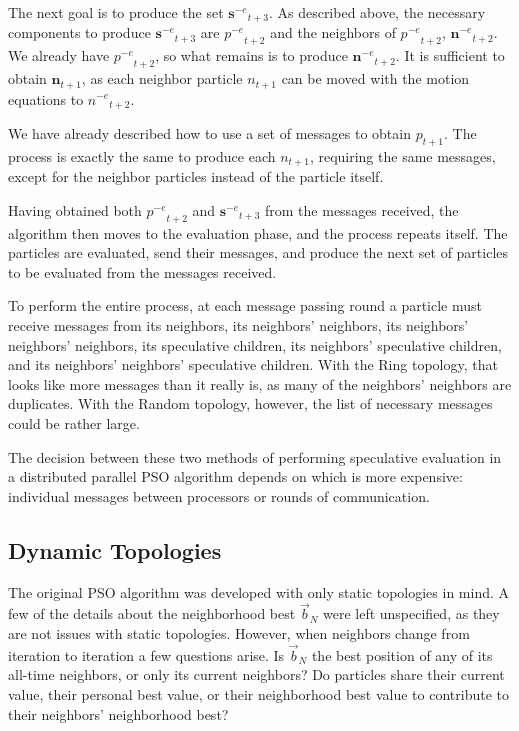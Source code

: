 \documentclass[conference,letterpaper]{IEEEtran}
\providecommand{\nbest}{\ensuremath{\Vec{b}_N}}
\providecommand{\noeval}[1]{\ensuremath{#1^{-e}}}
\providecommand{\p}{\ensuremath{p}}
\providecommand{\sset}{\ensuremath{\mathbf{s}}}
\providecommand{\n}{\ensuremath{n}}
\providecommand{\nset}{\ensuremath{\mathbf{n}}}
\begin{document}
The next goal is to produce the set $\noeval{\sset}_{t+3}$.  As described
above, the necessary components to produce $\noeval{\sset}_{t+3}$ are
$\noeval{\p}_{t+2}$ and the neighbors of $\noeval{\p}_{t+2}$,
$\noeval{\nset}_{t+2}$.  We already have $\noeval{\p}_{t+2}$, so what remains
is to produce $\noeval{\nset}_{t+2}$.  It is sufficient to obtain
$\nset_{t+1}$, as each neighbor particle $\n_{t+1}$ can be moved with the
motion equations to $\noeval{\n}_{t+2}$.

We have already described how to use a set of messages to obtain $\p_{t+1}$.
The process is exactly the same to produce each $\n_{t+1}$, requiring the same
messages, except for the neighbor particles instead of the particle itself.

Having obtained both $\noeval{\p}_{t+2}$ and $\noeval{\sset}_{t+3}$ from the
messages received, the algorithm then moves to the evaluation phase, and the
process repeats itself.  The particles are evaluated, send their messages, and
produce the next set of particles to be evaluated from the messages received.

To perform the entire process, at each message passing round a particle must
receive messages from its neighbors, its neighbors' neighbors, its neighbors'
neighbors' neighbors, its speculative children, its neighbors' speculative
children, and its neighbors' neighbors' speculative children.  With the Ring
topology, that looks like more messages than it really is, as many of the
neighbors' neighbors are duplicates.  With the Random topology, however, the
list of necessary messages could be rather large.  

The decision between these two methods of performing speculative evaluation in
a distributed parallel PSO algorithm depends on which is more expensive: 
individual messages between processors or rounds of communication.

\subsection{Dynamic Topologies}

The original PSO algorithm was developed with only static topologies in mind. A
few of the details about the neighborhood best $\nbest$ were left unspecified,
as they are not issues with static topologies.  However, when neighbors change
from iteration to iteration a few questions arise.  Is $\nbest$ the best
position of any of its all-time neighbors, or only its current neighbors?  Do
particles share their current value, their personal best value, or their
neighborhood best value to contribute to their neighbors' neighborhood best?
\end{document}
